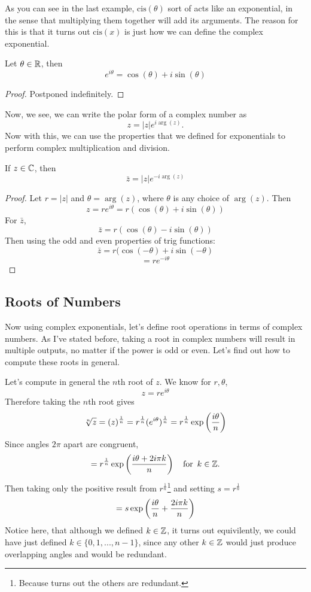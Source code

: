  As you can see in the last example, $\text{cis}(\theta)$ sort of acts like an exponential, in the sense that multiplying them together will add its arguments. The reason for this is that it turns out $\text{cis}(x)$ is just how we can define the complex exponential.
 
 \begin{theorem}
 	Let $\theta\in\mathbb{R}$, then
 	$$e^{i\theta}=\cos(\theta)+i\sin(\theta)$$	
 \end{theorem}
 \begin{proof}
 	Postponed indefinitely.
 \end{proof}
 
 Now, we see, we can write the polar form of a complex number as
 $$z=|z|e^{i\arg(z)}.$$
Now with this, we can use the properties that we defined for exponentials to perform complex multiplication and division.

\begin{theorem}
	If $z\in\mathbb{C}$, then 
	$$\bar{z}=|z|e^{-i\arg(z)}$$
\end{theorem}
\begin{proof}
	Let $r=|z|$ and $\theta=\arg(z)$, where $\theta$ is any choice of $\arg(z)$.
	Then
	$$z=re^{i\theta}=r(\cos(\theta)+i\sin(\theta))$$
	For $\bar{z}$,
	$$\bar{z}=r(\cos(\theta)-i\sin(\theta))$$
	Then using the odd and even properties of trig functions:
	$$\bar{z}=r(\cos(-\theta)+i\sin(-\theta)$$
	$$=re^{-i\theta}$$
\end{proof}

\subsection{Roots of Numbers}
Now using complex exponentials, let's define root operations in terms of complex numbers. As I've stated before, taking a root in complex numbers will result in multiple outputs, no matter if the power is odd or even. Let's find out how to compute these roots in general.

\begin{ex}
	Let's compute in general the $n$th root of $z$. We know for $r,\theta$,
	$$z=re^{i\theta}$$
	Therefore taking the $n$th root gives
	$$\sqrt[n]{z}=(z)^{\frac{1}{n}}=r^{\frac{1}{n}}(e^{i\theta})^\frac{1}{n}
	=r^{\frac{1}{n}}\exp\left(\frac{i\theta}{n}\right)$$
	Since angles $2\pi$ apart are congruent,
	$$=r^{\frac{1}{n}}\exp\left(\frac{i\theta+2i\pi k}{n}\right) \quad\text{for }\, k\in\mathbb{Z}.$$
	Then taking only the positive result from $r^{\frac{1}{n}}$\footnote{Because turns out the others are redundant.}
	and setting $s=r^\frac{1}{n}$
	$$=s\exp\left(\frac{i\theta}{n}+\frac{2i\pi k}{n}\right)$$
	Notice here, that although we defined $k\in\mathbb{Z}$, it turns out equivilently, we could have just defined $k\in\{0,1,...,n-1\}$, since any other $k\in\mathbb{Z}$ would just produce overlapping angles and would be redundant.
\end{ex}

